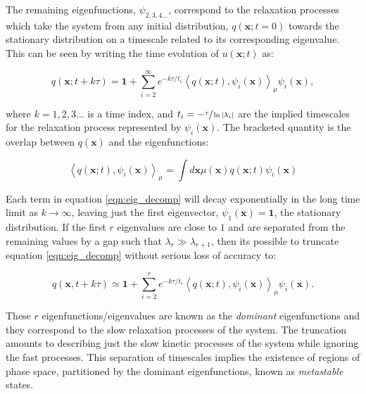 The remaining eigenfunctions, $\psi_{2,3,4...}$, correspond to the relaxation processes which take the system from any initial distribution, $q(\mathbf{x} ; t=0)$ towards the stationary distribution on a timescale related to its corresponding eigenvalue. This can be seen by writing the time evolution of $u(\mathbf{x};t)$ as:

\begin{equation}\label{eqn:eig_decomp}
q(\mathbf{x} ; t+k \tau)=\mathbf{1}+\sum_{i=2}^{\infty} e^{-k \tau / t_{i}}\left\langle q(\mathbf{x} ; t), \psi_{i}(\mathbf{x})\right\rangle_{\mu} \psi_{i}(\mathbf{x}),
\end{equation}

where $k=1,2,3 \ldots$ is a time index, and $t_{i}=-\sfrac{\tau}{\ln{|\lambda_{i}|}}$ are the implied timescales for the relaxation process represented by $\psi_{i}(\mathbf{x})$. The bracketed quantity is the overlap between $q(\mathbf{x})$ and the eigenfunctions:

\begin{equation}
\left\langle q(\mathbf{x} ; t), \psi_{i}(\mathbf{x})\right\rangle_{\mu}=\int d \mathbf{x} \mu(\mathbf{x}) q(\mathbf{x} ; t) \psi_{i}(\mathbf{x})
\end{equation}

Each term in equation \ref{eqn:eig_decomp} will decay exponentially in the long time limit as $k \rightarrow \infty$, leaving just the first eigenvector, $\psi_{1}(\mathbf{x})=\mathbf{1}$, the stationary distribution. If the first $r$ eigenvalues are close to $1$ and are separated from the remaining values by a gap such that $\lambda_{r} \gg \lambda_{r+1}$, then its possible to truncate equation \ref{eqn:eig_decomp} without serious loss of accuracy to:

\begin{equation}
q(\mathbf{x},  t+k \tau)  \simeq \mathbf{1}+\sum_{i=2}^{r} e^{-k \tau / t_{i}}\left\langle q(\mathbf{x} ; t), \psi_{i}(\mathbf{x})\right\rangle_{\mu} \psi_{i}(\mathbf{x}).
\end{equation}

These $r$ eigenfunctions/eigenvalues are known as the \emph{dominant} eigenfunctions and they correspond to the slow relaxation processes of the system. The truncation amounts to describing just the slow kinetic processes of the system while ignoring the fast processes. This separation of timescales implies the existence of regions of phase space, partitioned by the dominant eigenfunctions, known as \emph{metastable} states. 

